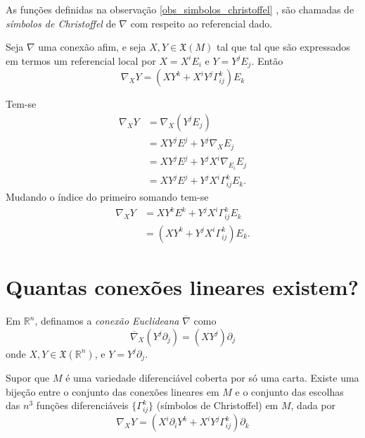 \begin{definicao} 
	As funções definidas na observação \ref{obs_simbolos_christoffel} , são chamadas de \emph{símbolos de Christoffel} de $\nabla$ com respeito ao referencial dado.
\end{definicao}

\begin{lema}\label{conexiones lineales en función de símbolos de Chritoffel}
	Seja $\nabla$ uma conexão afim, e seja $X,Y \in \mathfrak{X}(M)$ tal que tal que são expressados em termos um referencial local por $X = X^i E_i$ e $Y = Y^j E_j$. Então
	\begin{equation*}
		\nabla_X Y = \left( X Y^k + X^i Y^j \Gamma^k_{ij} \right) E_k
	\end{equation*}
\end{lema}

\begin{demonstracao}
	Tem-se
	\begin{align*}
		\nabla_X Y &= \nabla_X (Y^j E_j)\\
		&= X Y^j E^j + Y^j \nabla_X E_j\\
		&= X Y^j E^j + Y^j X^i \nabla_{E_i} E_j\\
		&= X Y^j E^j + Y^j X^i \Gamma^k_{ij} E_k.
	\end{align*}
	Mudando o índice do primeiro somando tem-se
	\begin{align*}
		\nabla_X Y &= X Y^k E^k + Y^j X^i \Gamma^k_{ij} E_k\\
		&= (X Y^k + Y^j X^i \Gamma^k_{ij}) E_k.
	\end{align*}
\end{demonstracao}

\section{Quantas conexões lineares existem?}

\begin{definicao}
	Em $\mathbb{R}^n$, definamos a \emph{conexão Euclideana} $\overline{\nabla}$ como
	\begin{equation*}
		\overline{\nabla}_X \left( Y^j \partial_j \right) = (X Y^j) \partial_j
	\end{equation*}
	onde $X,Y \in \mathfrak{X}(\mathbb{R}^n)$, e $Y = Y^j \partial_j$.
\end{definicao}

\begin{lema}\label{bijecao-entre-a-escolha-dos-simbolos-de-christoffel-e-as-conexoes-lineares}
	Supor que $M$ é uma variedade diferenciável coberta por só uma carta. Existe uma bijeção entre o conjunto das conexões lineares em $M$ e o conjunto das escolhas das $n^3$ funções diferenciáveis $\{ \Gamma^k_{ij} \}$ (símbolos de Christoffel) em $M$, dada por
	\begin{equation*}
		\nabla_X Y = \left( X^i \partial_i Y^k + X^i Y^j \Gamma^k_{ij} \right) \partial_k
	\end{equation*}
\end{lema}

